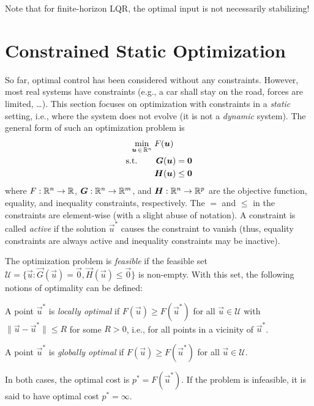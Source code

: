 			Note that for finite-horizon LQR, the optimal input is not necessarily stabilizing!

	\section{Constrained Static Optimization}
		\label{sec:staticOpt}

		So far, optimal control has been considered without any constraints. However, most real systems have constraints (e.g., a car shall stay on the road, forces are limited, \dots). This section focuses on optimization with constraints in a \emph{static} setting, i.e., where the system does not evolve (it is not a \emph{dynamic} system). The general form of such an optimization problem is
		\begin{align}
			\min_{\bm{u} \,\in\, \mathbb{R}^n}\; & F(\bm{u}) \\
			\text{s.t.}\qquad             &
			\begin{aligned}[t]
				\bm{G}(\bm{u}) & = \bm{0}    \\
				\bm{H}(\bm{u}) & \leq \bm{0}
			\end{aligned}
		\end{align}
		where \( F : \mathbb{R}^n \to \mathbb{R} \), \( \bm{G} : \mathbb{R}^n \to \mathbb{R}^m \), and \( \bm{H} : \mathbb{R}^n \to \mathbb{R}^p \) are the objective function, equality, and inequality constraints, respectively. The \(=\) and \(\leq\) in the constraints are element-wise (with a slight abuse of notation). A constraint is called \emph{active} if the solution \(\vec{u}^\ast\) causes the constraint to vanish (thus, equality constraints are always active and inequality constraints may be inactive).

		The optimization problem is \emph{feasible} if the feasible set \( \mathcal{U} = \{ \vec{u} : \vec{G}(\vec{u}) = \vec{0}, \vec{H}(\vec{u}) \leq \vec{0} \} \) is non-empty. With this set, the following notions of optimality can be defined:
		\begin{definition}
			A point \( \vec{u}^\ast \) is \emph{locally optimal} if \( F(\vec{u}) \geq F(\vec{u}^\ast) \) for all \( \vec{u} \in \mathcal{U} \) with \( \lVert \vec{u} - \vec{u}^\ast \rVert \leq R \) for some \( R > 0 \), i.e., for all points in a vicinity of \(\vec{u}^\ast\).
		\end{definition}
		\begin{definition}
			A point \( \vec{u}^\ast \) is \emph{globally optimal} if \( F(\vec{u}) \geq F(\vec{u}^\ast) \) for all \( \vec{u} \in \mathcal{U} \).
		\end{definition}
		In both cases, the optimal cost is \( p^\ast = F(\vec{u}^\ast) \). If the problem is infeasible, it is said to have optimal cost \( p^\ast = \infty \).

